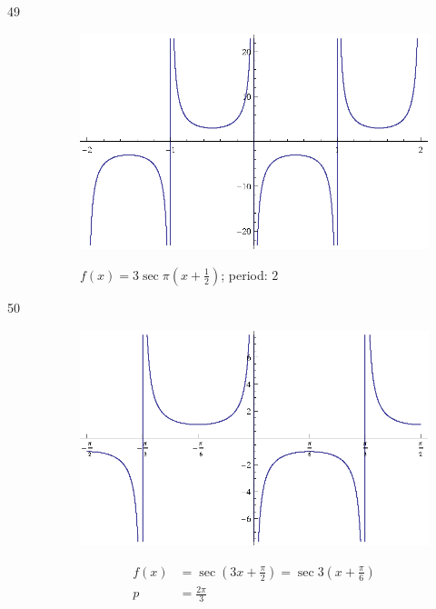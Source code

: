 \documentclass{exam}
\begin{document}
\begin{description}
      \item[49]
        \begin{figure}[H]
          \centering
          \includegraphics[scale=0.9]{exercise49.eps}

          $f(x) = 3 \sec \pi \left( x + \frac{1}{2} \right)$; period: $2$
        \end{figure}

      \item[50]  
        \begin{figure}[H]
          \centering
          \includegraphics[scale=0.9]{exercise50.eps}

          \begin{align*}
            f(x) & = \sec \left( 3x + \frac{\pi}{2} \right) = \sec 3 \left( x + \frac{\pi}{6} \right) \\
            p    & = \frac{2 \pi}{3} \\
          \end{align*}
        \end{figure}



\end{description}
\end{document}
